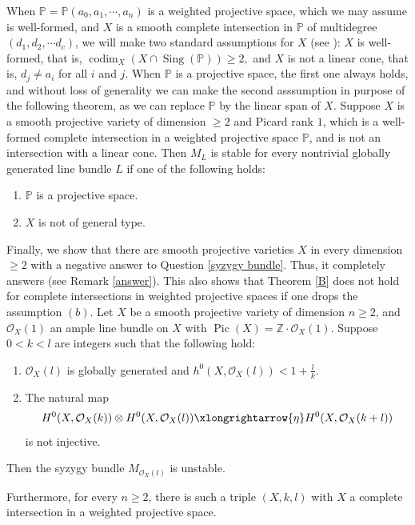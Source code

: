 \documentclass[11pt,letterpaper]{amsart}
\newenvironment{manualtheorem}[1]{%
  \renewcommand\themanualtheoreminner{#1}%
  \manualtheoreminner
}{\endmanualtheoreminner}
\begin{document}
When $\mathbb{P}=\mathbb{P}(a_0, a_1,\cdots, a_n)$ is a weighted projective space, which we may assume is well-formed, and $X$ is a smooth complete intersection in $\mathbb{P}$ of multidegree $(d_1, d_2,\cdots d_c)$, we will make two standard assumptions for $X$ (see \cite{pizzato2017effective}): $X$ is well-formed, that is, $\operatorname{codim}_X\!\left(X\cap \operatorname{Sing}(\mathbb{P})\right)\ge 2,$ and $X$ is not a linear cone, that is, $d_j\neq a_i$ for all $i$ and $j$. When $\mathbb{P}$ is a projective space, the first one always holds, and without loss of generality we can make the second asssumption in purpose of the following theorem, as we can replace $\mathbb{P}$ by the linear span of $X$.
\begin{manualtheorem}{B}\label{B}
Suppose $X$ is a smooth projective variety of dimension $\geq 2$ and
Picard rank $1$, which is a well-formed complete intersection in a weighted projective
space $\mathbb P$, and is not an intersection with a linear cone.
Then $M_L$ is stable for every nontrivial globally generated line bundle $L$ if one
of the following holds:
\begin{enumerate}
\item[(a)] $\mathbb P$ is a projective space.
\item[(b)] $X$ is not of general type.
\end{enumerate}
\end{manualtheorem}

Finally, we show that there are smooth projective varieties $X$ in every dimension $\geq 2$ with a negative answer to Question \ref{syzygy bundle}. Thus, it completely answers \cite[Question 2(1)]{fulger2022positivity} (see Remark \ref{answer}). This also shows that Theorem \ref{B} does not hold for complete intersections in weighted projective spaces if one drops the assumption $(b)$. 
\begin{manualtheorem}{C}\label{C}
Let $X$ be a smooth projective variety of dimension $n\ge2$, and
$\mathcal O_X(1)$ an ample line bundle on $X$ with $\operatorname{Pic}(X)=\mathbb Z\cdot \mathcal O_X(1).$
Suppose $0<k<l$ are integers such that the following hold:

\begin{enumerate}
\item[(i)] $\mathcal O_X(l)$ is globally generated and $h^0(X,\mathcal O_X(l))
<
1+\frac{l}{k}.$

\item[(ii)] The natural map
\[
H^0(X,\mathcal O_X(k))
\otimes
H^0(X,\mathcal O_X(l))
\xlongrightarrow{\eta}
H^0(X,\mathcal O_X(k+l))
\]
is not injective.
\end{enumerate}

Then the syzygy bundle $M_{\mathcal O_X(l)}$ is unstable.

Furthermore, for every $n\ge2$, there is such a triple
$(X,k,l)$ with $X$ a complete intersection in a weighted projective
space.
\end{manualtheorem}
\end{document}
